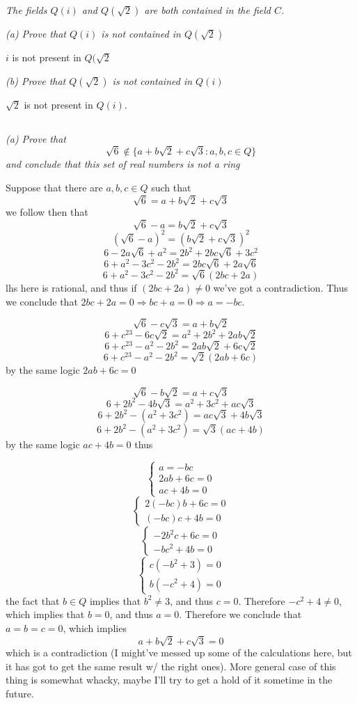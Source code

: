 \documentclass[11pt,oneside,titlepage]{book}
\DeclareMathOperator \ra {\Rightarrow}
\newcommand{\set}[1]{\{ #1 \}}
\begin{document}
\textit{The fields $Q(i)$ and $Q(\sqrt{2})$ are both contained in the field $C$.}

\textit{(a) Prove that $Q(i)$ is not contained in $Q(\sqrt{2})$}

$i$ is not present in $Q(\sqrt{2}$

\textit{(b) Prove that $Q(\sqrt{2})$ is not contained in $Q(i)$}

$\sqrt{2}$ is not present in $Q(i)$.

\subsection{}

\textit{(a) Prove that
  $$\sqrt{6} \notin \set{a + b\sqrt{2} + c\sqrt{3}: a, b, c \in Q}$$
  and conclude that this set of real numbers is not a ring }

Suppose that there are $a, b, c \in Q$ such that
$$\sqrt{6} = a + b\sqrt{2} + c\sqrt{3}$$
we follow then that
$$\sqrt{6} - a = b\sqrt{2} + c\sqrt{3}$$
$$(\sqrt{6} - a)^2 = (b\sqrt{2} + c\sqrt{3})^2$$
$$6 - 2a\sqrt{6} + a^2 = 2b^2 + 2bc\sqrt{6} + 3c^2$$
$$6  + a^2 - 3c^2 - 2b^2 = 2bc\sqrt{6} + 2a\sqrt{6} $$
$$6  + a^2 - 3c^2 - 2b^2 = \sqrt{6}(2bc + 2a) $$
lhs here is rational, and thus if $(2bc + 2a) \neq 0$ we've got a contradiction. Thus
we conclude that $2bc + 2a = 0 \ra bc + a = 0 \ra a = -bc$.

$$\sqrt{6} - c\sqrt{3}= a + b\sqrt{2} $$
$$6 + c^23 - 6c \sqrt{2}= a^2 + 2b^2 + 2ab\sqrt{2}$$
$$6 + c^23 - a^2 - 2b^2 =  2ab\sqrt{2} +  6c \sqrt{2}$$
$$6 + c^23 - a^2 - 2b^2 =  \sqrt{2}(2ab + 6c)$$
by the same logic $2ab + 6c = 0$

$$\sqrt{6} - b\sqrt{2}= a + c\sqrt{3} $$
$$6 + 2b^2 - 4b\sqrt{3}= a^2 + 3c^2 + ac\sqrt{3}$$
$$6 + 2b^2 - (a^2 + 3c^2) = ac\sqrt{3} + 4b\sqrt{3}$$
$$6 + 2b^2 - (a^2 + 3c^2) = \sqrt{3}(ac + 4b)$$
by the same logic $ac + 4b = 0$
thus

$$
\begin{cases}
  a = -bc \\
  2ab + 6c = 0 \\
  ac + 4b = 0
\end{cases}
$$
$$
\begin{cases}
  2(-bc)b + 6c = 0 \\
  (-bc)c + 4b = 0
\end{cases}
$$
$$
\begin{cases}
  -2b^2c + 6c = 0 \\
  -bc^2 + 4b = 0
\end{cases}
$$
$$
\begin{cases}
  c(-b^2 + 3) = 0 \\
  b(-c^2 + 4) = 0
\end{cases}
$$
the fact that $b \in Q$ implies that $b^2 \neq 3$, and thus $c =
0$. Therefore $-c^2 + 4 \neq 0$, which implies that $b = 0$, and thus
$a = 0$. Therefore we conclude that $a = b = c = 0$, which implies
$$a + b\sqrt{2} + c\sqrt{3} = 0$$
which is a contradiction (I might've messed up some of the
calculations here, but it has got to get the same result w/ the right
ones). More general case of this thing is somewhat whacky, maybe I'll try
to get a hold of it sometime in the future.
\end{document}
